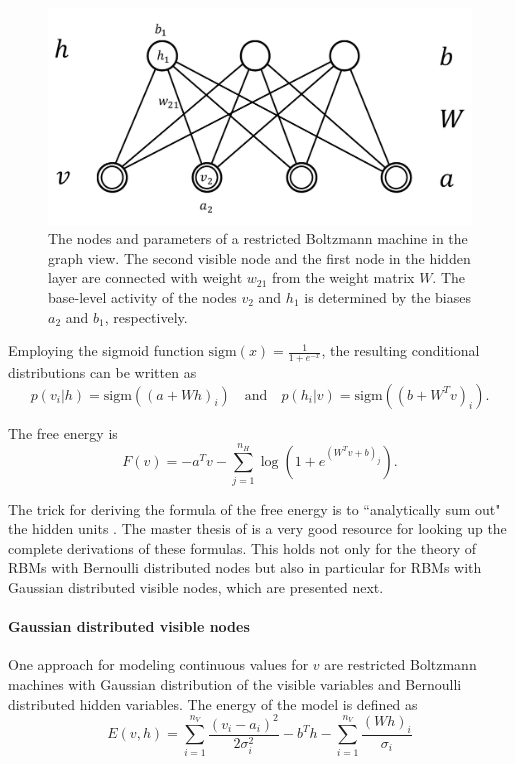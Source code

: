 \documentclass[12pt]{article}
\newcommand{\sigm}{\mathrm{sigm}}
\begin{document}
\begin{figure}[h]
   \centering
   \includegraphics[scale=0.5]{images/rbmweights.pdf}
   \caption{The nodes and parameters of a restricted Boltzmann machine in the graph view. The second visible node and the first node in the hidden layer are connected with weight $w_{21}$ from the weight matrix $W$. The base-level activity of the nodes $v_2$ and $h_1$ is determined by the biases $a_2$ and $b_1$, respectively.}
   \label{fig:rbmweights}
 \end{figure}


Employing the sigmoid function $\sigm(x) = \frac{1}{1+ e^{-x}}$, the resulting conditional distributions can be written as 
\begin{equation}
p(v_i | h) = \sigm ((a + W h)_i)
 \quad \text{and}\quad 
p(h_i | v) = \sigm ((b + W^T v)_i).
\label{eqn:condprobrbm}
\end{equation}

The free energy is
\begin{equation}
F(v) = - a^T v - \sum_{j=1}^{n_H} \log \left (1 + e^{(W^T v + b)_j}\right).
\label{eqn:freenergy_rbm}
\end{equation}

The trick for deriving the formula of the free energy is to ``analytically sum out" the hidden units \citep{sala2012anefficient}.
The master thesis of \cite{krizhevsky2009tinyimagesthesis} is a very good resource for looking up the complete derivations of these formulas. This holds not only for the theory of RBMs with Bernoulli distributed nodes but also in particular for RBMs with Gaussian distributed visible nodes, which are presented next.

\paragraph{Gaussian distributed visible nodes}\label{gaussianrbm}
One approach for modeling continuous values for $v$ are restricted Boltzmann machines with Gaussian distribution of the visible variables and Bernoulli distributed hidden variables. The energy of the model is defined as
\begin{equation}
   E(v,h) = \sum_{i=1}^{n_V}\frac{(v_i - a_i)^2}{2\sigma_i^2} - b^T h - \sum_{i=1}^{n_V} \frac{(Wh)_i}{\sigma_i}
   \label{eqn:energyformulagbrbm}
\end{equation}
\end{document}
